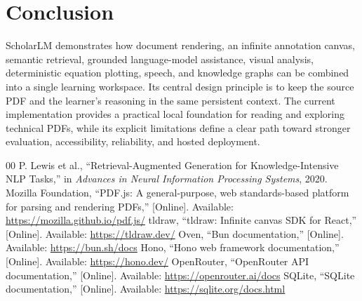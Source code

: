 \documentclass[conference]{IEEEtran}
\begin{document}
\section{Conclusion}
ScholarLM demonstrates how document rendering, an infinite annotation canvas, semantic retrieval, grounded language-model assistance, visual analysis, deterministic equation plotting, speech, and knowledge graphs can be combined into a single learning workspace. Its central design principle is to keep the source PDF and the learner's reasoning in the same persistent context. The current implementation provides a practical local foundation for reading and exploring technical PDFs, while its explicit limitations define a clear path toward stronger evaluation, accessibility, reliability, and hosted deployment.

\begin{thebibliography}{00}
 P. Lewis et al., ``Retrieval-Augmented Generation for Knowledge-Intensive NLP Tasks,'' in \emph{Advances in Neural Information Processing Systems}, 2020.
 Mozilla Foundation, ``PDF.js: A general-purpose, web standards-based platform for parsing and rendering PDFs,'' [Online]. Available: \url{https://mozilla.github.io/pdf.js/}
 tldraw, ``tldraw: Infinite canvas SDK for React,'' [Online]. Available: \url{https://tldraw.dev/}
 Oven, ``Bun documentation,'' [Online]. Available: \url{https://bun.sh/docs}
 Hono, ``Hono web framework documentation,'' [Online]. Available: \url{https://hono.dev/}
 OpenRouter, ``OpenRouter API documentation,'' [Online]. Available: \url{https://openrouter.ai/docs}
 SQLite, ``SQLite documentation,'' [Online]. Available: \url{https://sqlite.org/docs.html}
\end{thebibliography}
\end{document}

